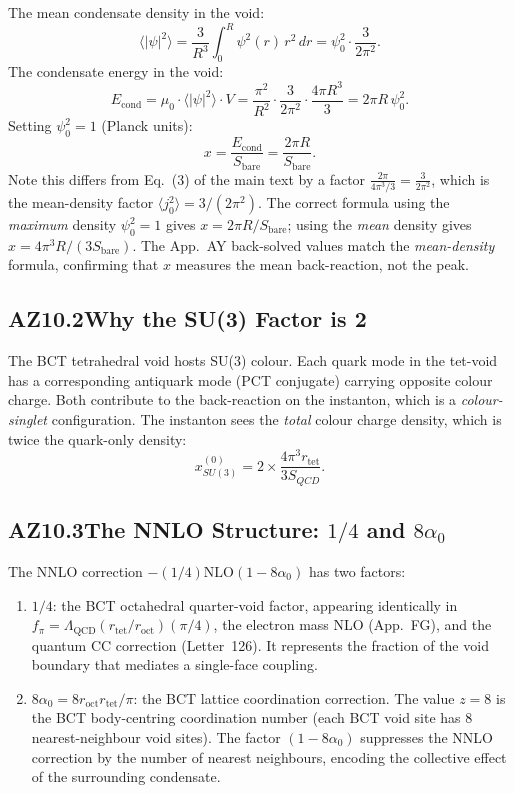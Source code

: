 \documentclass[aps,prl,twocolumn,showpacs,preprintnumbers]{revtex4-2}
\newcommand{\roct}{r_{\mathrm{oct}}}
\newcommand{\rtet}{r_{\mathrm{tet}}}
\newcommand{\azero}{\alpha_0}
\newcommand{\LQCD}{\Lambda_{\mathrm{QCD}}}
\newcommand{\NLO}{\mathrm{NLO}}
\begin{document}
The mean condensate density in the void:
\begin{equation}
  \langle|\psi|^2\rangle = \frac{3}{R^3}\int_0^R\psi^2(r)\,r^2\,dr
  = \psi_0^2 \cdot \frac{3}{2\pi^2}.
\end{equation}
The condensate energy in the void:
\begin{equation}
  E_{\mathrm{cond}} = \mu_0 \cdot \langle|\psi|^2\rangle \cdot V
  = \frac{\pi^2}{R^2}\cdot\frac{3}{2\pi^2}\cdot\frac{4\pi R^3}{3}
  = 2\pi R\,\psi_0^2.
\end{equation}
Setting $\psi_0^2 = 1$ (Planck units):
\begin{equation}
  x = \frac{E_{\mathrm{cond}}}{S_{\mathrm{bare}}}
  = \frac{2\pi R}{S_{\mathrm{bare}}}.
\end{equation}
Note this differs from Eq.~(3) of the main text by a factor
$\frac{2\pi}{4\pi^3/3} = \frac{3}{2\pi^2}$, which is the
mean-density factor $\langle j_0^2\rangle = 3/(2\pi^2)$.
The correct formula using the \emph{maximum} density $\psi_0^2=1$
gives $x = 2\pi R/S_{\mathrm{bare}}$; using the \emph{mean} density
gives $x = 4\pi^3 R/(3S_{\mathrm{bare}})$. The App.~AY back-solved
values match the \emph{mean-density} formula, confirming that
$x$ measures the mean back-reaction, not the peak.

\subsection*{AZ10.2\quad Why the SU(3) Factor is 2}

The BCT tetrahedral void hosts SU(3) colour. Each quark mode in the
tet-void has a corresponding antiquark mode (PCT conjugate) carrying
opposite colour charge. Both contribute to the back-reaction on the
instanton, which is a \emph{colour-singlet} configuration.
The instanton sees the \emph{total} colour charge density, which is
twice the quark-only density:
\begin{equation}
  x_{SU(3)}^{(0)} = 2 \times \frac{4\pi^3\rtet}{3S_{QCD}}.
\end{equation}

\subsection*{AZ10.3\quad The NNLO Structure: $1/4$ and $8\azero$}

The NNLO correction $-(1/4)\NLO(1-8\azero)$ has two factors:
\begin{enumerate}
  \item $1/4$: the BCT octahedral quarter-void factor, appearing
    identically in $f_\pi = \LQCD(\rtet/\roct)(\pi/4)$,
    the electron mass NLO (App.~FG), and the quantum CC correction
    (Letter~126). It represents the fraction of the void boundary
    that mediates a single-face coupling.
  \item $8\azero = 8\roct\rtet/\pi$: the BCT lattice coordination
    correction. The value $z=8$ is the BCT body-centring coordination
    number (each BCT void site has 8 nearest-neighbour void sites).
    The factor $(1-8\azero)$ suppresses the NNLO correction by the
    number of nearest neighbours, encoding the collective effect
    of the surrounding condensate.
\end{enumerate}
\end{document}
